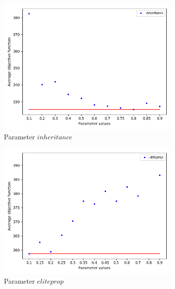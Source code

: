 \begin{figure}[H]
\begin{subfigure}[b]{.49\linewidth}
\includegraphics[width=\linewidth]{./img/best-inheritance.png}
\caption{Parameter $inheritance$ }\label{fig2c}
\end{subfigure}%
\begin{subfigure}[b]{.49\linewidth}
\centering
\includegraphics[width=\linewidth]{./img/best-eliteprop.png}
\caption{Parameter $eliteprop$ }\label{fig2d}
\end{subfigure}\vfill
\begin{subfigure}[b]{.49\linewidth}
\centering

\end{subfigure}
\end{figure}

